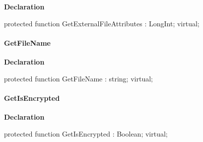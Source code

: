 \documentclass{report}
\newif\ifpdf
\begin{document}
\label{AbArcTyp.TAbArchiveItem-GetExternalFileAttributes}
\begin{list}{}{
\setlength{\itemindent}{0cm}
\setlength{\listparindent}{0cm}
\setlength{\leftmargin}{\evensidemargin}
\addtolength{\leftmargin}{\tmplength}
\settowidth{\labelsep}{X}
\addtolength{\leftmargin}{\labelsep}
\setlength{\labelwidth}{\tmplength}
}
\item[\textbf{Declaration}\hfill]
\ifpdf
\begin{flushleft}
\fi
\begin{ttfamily}
protected function GetExternalFileAttributes : LongInt; virtual;\end{ttfamily}

\ifpdf
\end{flushleft}
\fi

\end{list}
\paragraph*{GetFileName}\hspace*{\fill}

\label{AbArcTyp.TAbArchiveItem-GetFileName}
\begin{list}{}{
\setlength{\itemindent}{0cm}
\setlength{\listparindent}{0cm}
\setlength{\leftmargin}{\evensidemargin}
\addtolength{\leftmargin}{\tmplength}
\settowidth{\labelsep}{X}
\addtolength{\leftmargin}{\labelsep}
\setlength{\labelwidth}{\tmplength}
}
\item[\textbf{Declaration}\hfill]
\ifpdf
\begin{flushleft}
\fi
\begin{ttfamily}
protected function GetFileName : string; virtual;\end{ttfamily}

\ifpdf
\end{flushleft}
\fi

\end{list}
\paragraph*{GetIsEncrypted}\hspace*{\fill}

\label{AbArcTyp.TAbArchiveItem-GetIsEncrypted}
\begin{list}{}{
\setlength{\itemindent}{0cm}
\setlength{\listparindent}{0cm}
\setlength{\leftmargin}{\evensidemargin}
\addtolength{\leftmargin}{\tmplength}
\settowidth{\labelsep}{X}
\addtolength{\leftmargin}{\labelsep}
\setlength{\labelwidth}{\tmplength}
}
\item[\textbf{Declaration}\hfill]
\ifpdf
\begin{flushleft}
\fi
\begin{ttfamily}
protected function GetIsEncrypted : Boolean; virtual;\end{ttfamily}

\ifpdf
\end{flushleft}
\fi

\end{list}
\end{document}
